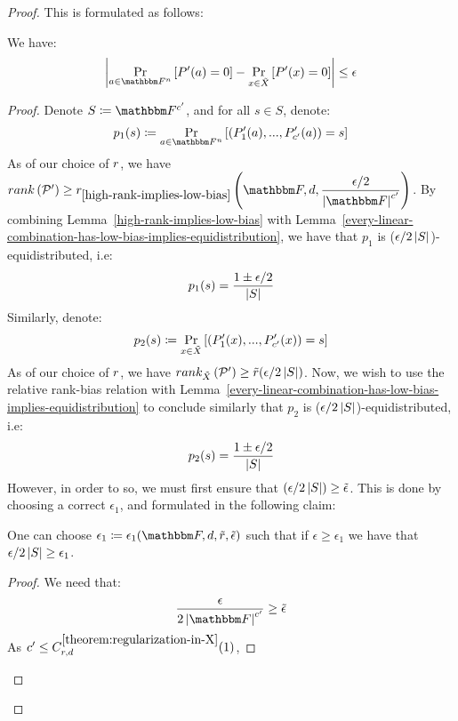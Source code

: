\begin{proof}
    This is formulated as follows:
    \begin{claim}\label{claim:p-and-P-have-the-same-approximation}
        We have:
        \[
            \abs{\prex{a \in \field}{\genpoly^\prime(a)= 0} -
            \prex{x \in \variety}{\genpoly^\prime(x) = 0}} \leq  \epsilon
        \]
    \end{claim}
    \begin{proof}
        Denote $S \definedas \basefield^{c^\prime}$, and for all $s \in S$, denote:
        \[
            p_1(s) \definedas \prex{a \in \field}{(\genpoly^{\prime}_1(a),...,\genpoly^{\prime}_{c^\prime}(a)) = s}
        \]
        As of our choice of ${{{r}}}$, we have $\rank{\genpolyset^{\prime}} \geq \rankfunc_{\ref{high-rank-implies-low-bias}} \parens {\basefield, \degree, \dfrac{\epsilon/2}{\abs{\basefield}^{c^\prime}}}$.
        By combining Lemma~{\ref{high-rank-implies-low-bias}} with Lemma~{\ref{every-linear-combination-has-low-bias-implies-equidistribution}},
        we have that $p_1$ is ($\epsilon/2\left| S \right|$)-equidistributed, i.e:
        \[
            p_1(s) = \dfrac{1 \pm \epsilon/2}{\left| S \right|}
        \]
        Similarly, denote:
        \[
            p_2(s) \definedas \prex{x \in \variety}{(\genpoly^{\prime}_1(x),...,\genpoly^{\prime}_{c^\prime}(x)) = s}
        \]
        As of our choice of ${{{r}}}$, we have $\relrank{\variety}{\genpolyset^\prime} \geq \rankbiasfunc(\epsilon / 2\abs{S})$.
        Now, we wish to use the relative rank-bias relation with Lemma~\ref{every-linear-combination-has-low-bias-implies-equidistribution}
        to conclude similarly that $p_2$ is ($\epsilon/2\left| S \right|$)-equidistributed, i.e:
        \[
            p_2(s) = \dfrac{1 \pm \epsilon/2}{\left| S \right|}
        \]
        However, in order to so, we must first ensure that $(\epsilon/2\left| S \right|) \geq {\tilde{\epsilon}}$.
        This is done by choosing a correct $\epsilon_1$, and formulated in the following claim:
        \begin{claim}
            One can choose $\epsilon_1 \definedas \epsilon_1(\basefield, \degree, \rankbiasfunc, \epsilonlimitedrankbias)$ such that if $\epsilon \geq \epsilon_1$ we have that $\epsilon/2\left| S \right| \geq \epsilon_1$.
        \end{claim}
        \begin{proof}
            We need that:
            \[
                \dfrac{\epsilon}{2 \abs{\basefield}^{c^\prime}} \geq \epsilonlimitedrankbias
            \]
            As $c^\prime \leq C^{\ref{theorem:regularization-in-X}}_{{{{r}}}, d}(1)$,

\end{proof}
\end{proof}
\end{proof}
